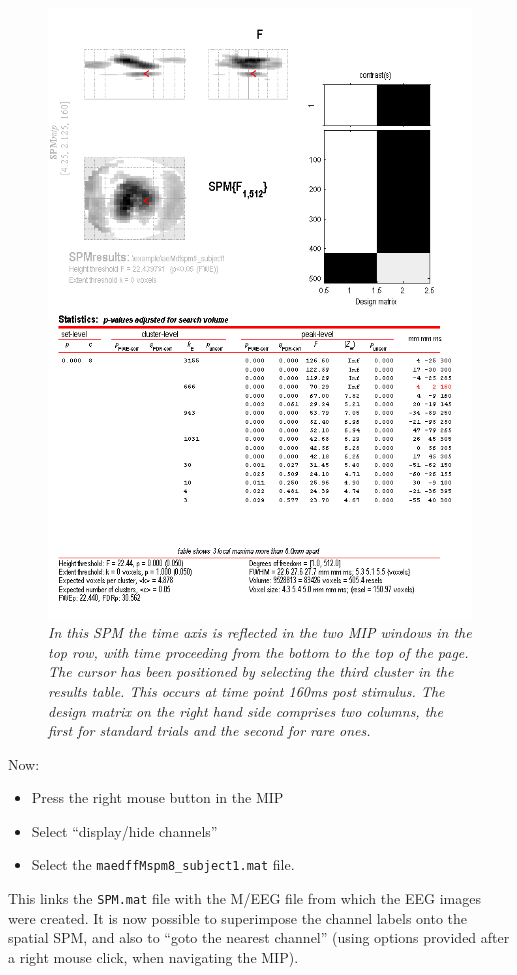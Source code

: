  \begin{figure}
\begin{center}
\includegraphics[width=120mm]{mmn/3DSPM}
\caption{\em In this SPM the time axis is reflected in the two MIP windows in the top row, with time proceeding from the bottom to the top of the page. The cursor has been positioned by selecting the third cluster in the results table. This occurs at time point 160ms post stimulus. The design matrix on the right hand side comprises two columns, the first for standard trials and the second for rare ones. \label{3DSPM}}
\end{center}
\end{figure}
Now:
\begin{itemize}
\item{Press the right mouse button in the MIP}
\item{Select ``display/hide channels''}
\item{Select the \texttt{maedffMspm8\_subject1.mat} file.}
\end{itemize}
This links the \texttt{SPM.mat} file with the M/EEG file from which the EEG images were created.
It is now possible to superimpose the channel labels onto the spatial SPM, and also to ``goto the nearest channel'' (using options provided after a right mouse click, when navigating the MIP).

